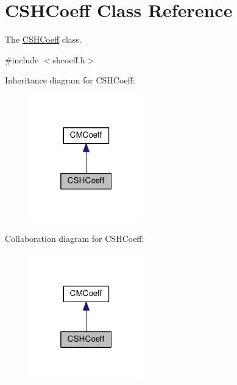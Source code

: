 \hypertarget{classCSHCoeff}{\section{C\-S\-H\-Coeff Class Reference}
\label{classCSHCoeff}
}


The \hyperlink{classCSHCoeff}{C\-S\-H\-Coeff} class.  




{\ttfamily \#include $<$shcoeff.\-h$>$}



Inheritance diagram for C\-S\-H\-Coeff\-:\nopagebreak
\begin{figure}[H]
\begin{center}
\leavevmode
\includegraphics[width=140pt]{classCSHCoeff__inherit__graph}
\end{center}
\end{figure}


Collaboration diagram for C\-S\-H\-Coeff\-:\nopagebreak
\begin{figure}[H]
\begin{center}
\leavevmode
\includegraphics[width=140pt]{classCSHCoeff__coll__graph}
\end{center}
\end{figure}
